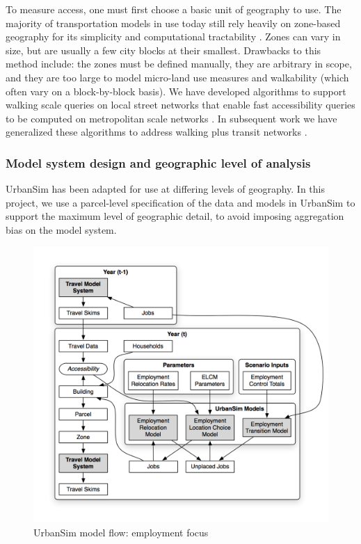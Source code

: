 To measure access, one must first choose a basic unit of geography to use.  The majority of transportation models in use today still rely heavily on zone-based geography for its simplicity and computational tractability \citep{hunt_current_2005}.  Zones can vary in size, but are usually a few city blocks at their smallest.  Drawbacks to this method include: the zones must be defined manually, they are arbitrary in scope, and they are too large to model micro-land use measures and walkability (which often vary on a block-by-block basis). We have developed algorithms to support walking scale queries on local street networks that enable fast accessibility queries to be computed on metropolitan scale networks \citep{foti2012generalized}.  In subsequent work we have generalized these algorithms to address walking plus transit networks \citep{blanchard-waddell-trr-2017, blanchard2017urbanaccess}. 


\subsubsection{Model system design and geographic level of analysis}

UrbanSim has been adapted for use at differing levels of geography. In this project, we use a parcel-level specification of the data and models in UrbanSim to support the maximum level of geographic detail, to avoid imposing aggregation bias on the model system. 


\begin{figure}[htbp]
    \center
    \includegraphics[width=\textwidth]{graphics/ParcelEmploymentModel.png}
    \caption{UrbanSim model flow: employment focus}
    \label{fig:employment-models}
\end{figure}

